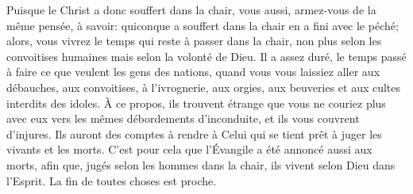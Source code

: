 Puisque le Christ a donc souffert dans la chair,
	vous aussi, armez-vous de la même pensée,
	à savoir: quiconque a souffert dans la chair en a fini avec le péché;
	alors, vous vivrez le temps qui reste à passer dans la chair,
	non plus selon les convoitises humaines
	mais selon la volonté de Dieu.
Il a assez duré, le temps passé à faire ce que veulent les gens des nations,
	quand vous vous laissiez aller aux débauches,
	aux convoitises, à l’ivrognerie, aux orgies, aux beuveries
	et aux cultes interdits des idoles.
À ce propos, ils trouvent étrange
	que vous ne couriez plus avec eux vers les mêmes débordements d’inconduite,
	et ils vous couvrent d’injures.
Ils auront des comptes à rendre
	à Celui qui se tient prêt à juger les vivants et les morts.
C’est pour cela que l’Évangile a été annoncé aussi aux morts,
	afin que, jugés selon les hommes dans la chair,
	ils vivent selon Dieu dans l’Esprit.
La fin de toutes choses est proche.
